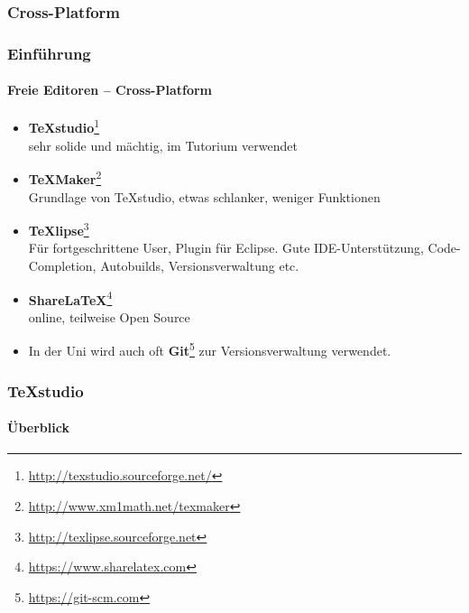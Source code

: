 \subsubsection{Cross-Platform}
\begin{frame}
\frametitle{Einführung}
\framesubtitle{Freie Editoren -- Cross-Platform}
\begin{itemize}
  \item \textbf{TeXstudio}\footnote{\url{http://texstudio.sourceforge.net/}}\\
  sehr solide und mächtig, im Tutorium verwendet
  \item \textbf{TeXMaker}\footnote{\url{http://www.xm1math.net/texmaker}}\\
   Grundlage von TeXstudio, etwas schlanker, weniger Funktionen
  \item \textbf{TeXlipse}\footnote{\url{http://texlipse.sourceforge.net}}\\ Für fortgeschrittene User, Plugin für
  Eclipse. Gute IDE-Unterstützung, Code-Completion, Autobuilds, Versionsverwaltung etc.
  \item \textbf{ShareLaTeX}\footnote{\url{https://www.sharelatex.com}}\\
  online, teilweise Open Source
  \item In der Uni wird auch oft \textbf{Git}\footnote{\url{https://git-scm.com}} zur Versionsverwaltung verwendet.
\end{itemize}
\end{frame}



\begin{frame}
\frametitle{TeXstudio}
\framesubtitle{\"Uberblick}
\end{frame}




